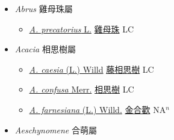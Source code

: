 
  \begin{itemize}
 \item[] \textit{Abrus} 雞母珠屬
                    
  \begin{itemize}
        \item[] \href{http://www.theplantlist.org/tpl1.1/search?q=Abrus+precatorius}{\textit{A. precatorius} L.}   \href{\detokenize{http://taibnet.sinica.edu.tw/chi/taibnet_species_list.php?T2=雞母珠&T2_new_value=true&fr=y}}{雞母珠} LC
  \end{itemize}
 \item[] \textit{Acacia} 相思樹屬
                    
  \begin{itemize}
        \item[] \href{http://www.theplantlist.org/tpl1.1/search?q=Acacia+caesia}{\textit{A. caesia} (L.) Willd}   \href{\detokenize{http://taibnet.sinica.edu.tw/chi/taibnet_species_list.php?T2=藤相思樹&T2_new_value=true&fr=y}}{藤相思樹} LC
        \item[] \href{http://www.theplantlist.org/tpl1.1/search?q=Acacia+confusa}{\textit{A. confusa} Merr.}   \href{\detokenize{http://taibnet.sinica.edu.tw/chi/taibnet_species_list.php?T2=相思樹&T2_new_value=true&fr=y}}{相思樹} LC
        \item[] \href{http://www.theplantlist.org/tpl1.1/search?q=Acacia+farnesiana}{\textit{A. farnesiana} (L.) Willd.}   \href{\detokenize{http://taibnet.sinica.edu.tw/chi/taibnet_species_list.php?T2=金合歡&T2_new_value=true&fr=y}}{金合歡} NA$^n$
  \end{itemize}
 \item[] \textit{Aeschynomene} 合萌屬
                    

\end{itemize}

